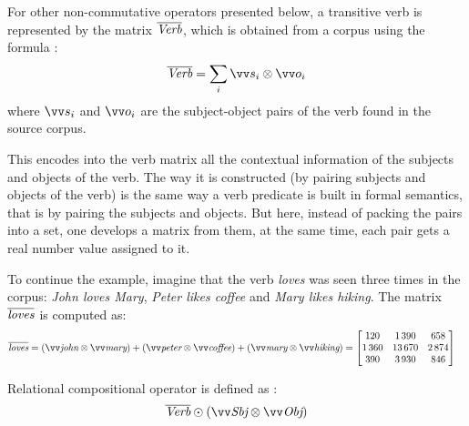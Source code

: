 
For other non-commutative operators presented below, a transitive verb is represented by the matrix $\overline{\text{\it Verb}}$, which is obtained from a corpus using the formula \cite{Grefenstette:2011:ESC:2145432.2145580}:
\begin{equation}
  \overline{\text{\it Verb}} = \sum_i\ov{s_i} \otimes \ov{o_i}
  \label{eq:verb-matrix}
\end{equation}
where $\ov{s_i}$ and $\ov{o_i}$ are the subject-object pairs of the verb found in the source corpus.

This encodes into the verb matrix all the contextual information of the subjects and objects of the verb. The way it is constructed (by pairing subjects and objects of the verb) is the same way a verb predicate is built in formal semantics, that is by pairing the subjects and objects. But here, instead of packing the pairs into a set, one develops a matrix from them, at the same time, each pair gets a real number value assigned to it.

To continue the example, imagine that the verb \textit{loves} was seen three times in the corpus: \textit{John loves Mary}, \textit{Peter likes coffee} and \textit{Mary likes hiking}. The matrix $\overline{\text{\it loves}}$ is computed as:
\begin{align*}
  \overline{\text{\it loves}} &= (\ov{\text{\it john}} \otimes \ov{\text{\it mary}}) + %
                                 (\ov{\text{\it peter}} \otimes \ov{\text{\it coffee}}) + %
                                 (\ov{\text{\it mary}} \otimes \ov{\text{\it hiking}}) = %
                                \begin{bmatrix}
                                     120 &  1\,390 &    658 \\
                                  1\,360 & 13\,670 & 2\,874 \\
                                     390 &  3\,930 &    846
                                \end{bmatrix}
\end{align*}

Relational compositional operator is defined as \cite{Grefenstette:2011:ESC:2145432.2145580}:
\begin{equation}
  \overline{\text{\it Verb}} \odot (\ov{\text{\it Sbj}} \otimes \ov{\text{\it Obj}})
\end{equation}

